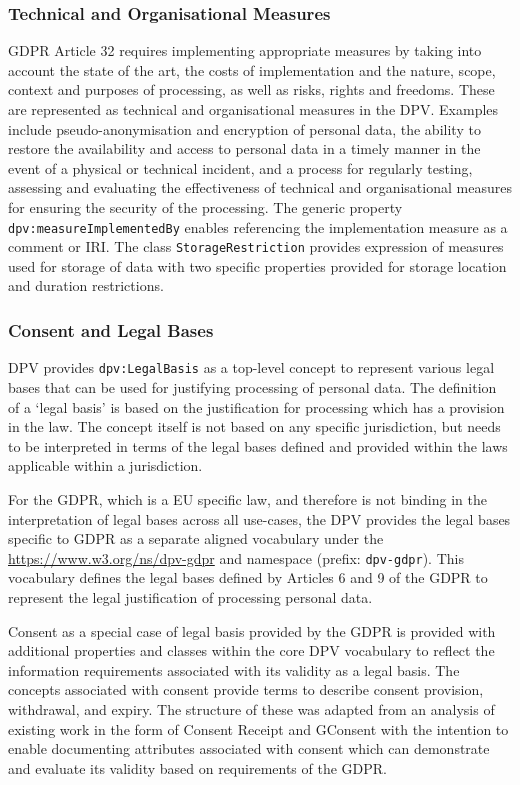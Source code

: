 \subsubsection{Technical and Organisational Measures}
GDPR Article 32 requires implementing appropriate measures by taking into account the state of the art, the costs of implementation and the nature, scope, context and purposes of processing, as well as risks, rights and freedoms.
These are represented as technical and organisational measures in the DPV.
Examples include pseudo-anonymisation and encryption of personal data, the ability to restore the availability and access to personal data in a timely manner in the event of a physical or technical incident, and a process for regularly testing, assessing and evaluating the effectiveness of technical and organisational measures for ensuring the security of the processing.
The generic property \texttt{dpv:measureImplementedBy} enables referencing the implementation measure as a comment or IRI.
The class \texttt{StorageRestriction} provides expression of measures used for storage of data with two specific properties provided for storage location and duration restrictions.

\subsubsection{Consent and Legal Bases}
DPV provides \texttt{dpv:LegalBasis} as a top-level concept to represent various legal bases that can be used for justifying processing of personal data.
The definition of a `legal basis' is based on the justification for processing which has a provision in the law. The concept itself is not based on any specific jurisdiction, but needs to be interpreted in terms of the legal bases defined and provided within the laws applicable within a jurisdiction.

For the GDPR, which is a EU specific law, and therefore is not binding in the interpretation of legal bases across all use-cases, the DPV provides the legal bases specific to GDPR as a separate aligned vocabulary under the \url{https://www.w3.org/ns/dpv-gdpr} and namespace (prefix: \texttt{dpv-gdpr}). 
This vocabulary defines the legal bases defined by Articles 6 and 9 of the GDPR to represent the legal justification of processing personal data.

Consent as a special case of legal basis provided by the GDPR is provided with additional properties and classes within the core DPV vocabulary to reflect the information requirements associated with its validity as a legal basis.
The concepts associated with consent provide terms to describe consent provision, withdrawal, and expiry.
The structure of these was adapted from an analysis of existing work in the form of Consent Receipt \cite{lizar_consent_2017} and GConsent \cite{pandit_gconsent_2019} with the intention to enable documenting attributes associated with consent which can demonstrate and evaluate its validity based on requirements of the GDPR.

